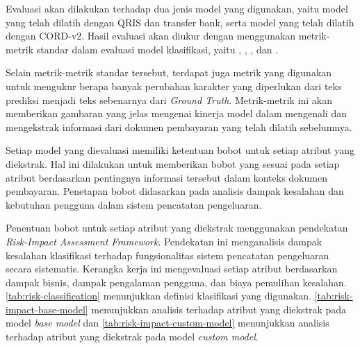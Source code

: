 Evaluasi akan dilakukan terhadap dua jenis model yang digunakan, yaitu model \donut{} yang telah dilatih dengan \dataset{} QRIS dan transfer bank, serta model \donut{} yang telah dilatih dengan \dataset{} CORD-v2. Hasil evaluasi akan diukur dengan menggunakan metrik-metrik standar dalam evaluasi model klasifikasi, yaitu \accuracy, \precision, \recall, dan \fscore. 

Selain metrik-metrik standar tersebut, terdapat juga metrik \mcer{} yang digunakan untuk mengukur berapa banyak perubahan karakter yang diperlukan dari teks prediksi menjadi teks sebenarnya dari \emph{Ground Truth}. Metrik-metrik ini akan memberikan gambaran yang jelas mengenai kinerja model dalam mengenali dan mengekstrak informasi dari dokumen pembayaran yang telah dilatih sebelumnya.

Setiap model yang dievaluasi memiliki ketentuan bobot untuk setiap atribut yang diekstrak. Hal ini dilakukan untuk memberikan bobot yang sesuai pada setiap atribut berdasarkan pentingnya informasi tersebut dalam konteks dokumen pembayaran. Penetapan bobot didasarkan pada analisis dampak kesalahan dan kebutuhan pengguna dalam sistem pencatatan pengeluaran.

Penentuan bobot untuk setiap atribut yang diekstrak menggunakan pendekatan \emph{Risk-Impact Assessment Framework}. Pendekatan ini menganalisis dampak kesalahan klasifikasi terhadap fungsionalitas sistem pencatatan pengeluaran secara sistematis. Kerangka kerja ini mengevaluasi setiap atribut berdasarkan dampak bisnis, dampak pengalaman pengguna, dan biaya pemulihan kesalahan. \autoref{tab:risk-classification} menunjukkan definisi klasifikasi yang digunakan. \autoref{tab:risk-impact-base-model} menunjukkan analisis terhadap atribut yang diekstrak pada model \emph{base model} dan \autoref{tab:risk-impact-custom-model} menunjukkan analisis terhadap atribut yang diekstrak pada model \emph{custom model}.

